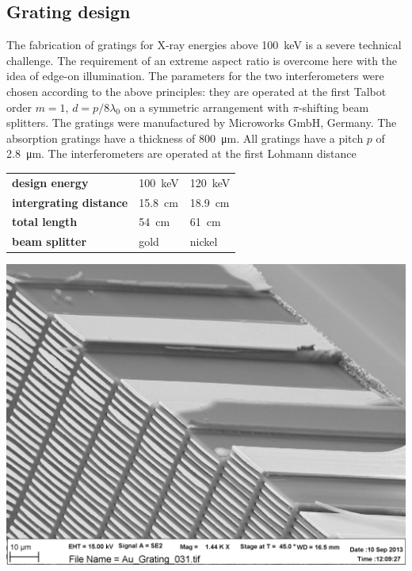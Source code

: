 \documentclass[a0,portrait]{a0poster}
\newenvironment{spacedcenter}{\vspace{2cm}\begin{center}}
        {\end{center}\vspace{2cm}\par}
\begin{document}
\begin{multicols}{2}
\section*{Grating design}
The fabrication of gratings for X-ray energies above \SI{100}{\kilo\eV} is a
severe technical challenge. The requirement of an extreme aspect ratio is
overcome here with the idea of edge-on illumination.
The parameters for the two interferometers were chosen according to the
above principles: they are operated at the first Talbot order $m=1$, $d = p
/ 8 \lambda_0$ on a symmetric arrangement with $\pi$-shifting beam
splitters.
The gratings were manufactured by Microworks GmbH, Germany. The absorption gratings have a thickness of \SI{800}{\micro\metre}.
All gratings have a pitch $p$ of \SI{2.8}{\micro\metre}.
The interferometers are operated at the first Lohmann distance 
\begin{spacedcenter}
\begin{tabular}{lll}
    \textbf{design energy} & \SI{100}{\kilo\eV} & \SI{120}{\kilo\eV}\\
    \textbf{intergrating distance} & \SI{15.8}{\centi\metre} &
    \SI{18.9}{\centi\metre}\\
    \textbf{total length} & \SI{54}{\centi\metre} & \SI{61}{\centi\metre}\\
    \textbf{beam splitter} & gold & nickel \\
\end{tabular}
\end{spacedcenter}
\begin{center}
    \includegraphics[width=0.5\linewidth]{Au_Grating_031.pdf}
\end{center}




\end{multicols}
\end{document}
